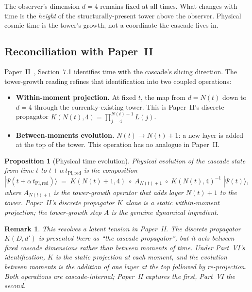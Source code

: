 \documentclass[12pt,a4paper]{article}
\newtheorem{proposition}[theorem]{Proposition}
\newtheorem*{remark}{Remark}
\begin{document}
The observer's dimension $d = 4$ remains fixed at all times. What changes with
time is the \emph{height} of the structurally-present tower above the observer.
Physical cosmic time is the tower's growth, not a coordinate the cascade lives
in.

\subsection{Reconciliation with Paper~II}

Paper~II~\cite{part2}, Section~7.1 identifies time with the cascade's slicing
direction. The tower-growth reading refines that identification into two coupled
operations:

\begin{itemize}[nosep]
\item \textbf{Within-moment projection.} At fixed $t$, the map from $d = N(t)$
down to $d = 4$ through the currently-existing tower. This is Paper~II's
discrete propagator $K(N(t), 4) = \prod_{j = 4}^{N(t) - 1} L(j)$.

\item \textbf{Between-moments evolution.} $N(t) \to N(t) + 1$: a new layer is
added at the top of the tower. This operation has no analogue in Paper~II.
\end{itemize}

\begin{proposition}[Physical time evolution]\label{prop:time-evolution}
Physical evolution of the cascade state from time $t$ to $t + \alpha\,
t_{\mathrm{Pl,red}}$ is the composition
\[
|\Psi(t + \alpha\,t_{\mathrm{Pl,red}})\rangle
\;=\; K(N(t) + 1, 4) \;\circ\; A_{N(t)+1} \;\circ\; K(N(t), 4)^{-1} \;
|\Psi(t)\rangle,
\]
where $A_{N(t)+1}$ is the tower-growth operator that adds layer $N(t) + 1$ to
the tower. Paper~II's discrete propagator $K$ alone is a static within-moment
projection; the tower-growth step $A$ is the genuine dynamical ingredient.
\end{proposition}

\begin{remark}
This resolves a latent tension in Paper~II. The discrete propagator $K(D, d')$
is presented there as ``the cascade propagator'', but it acts between fixed
cascade dimensions rather than between moments of time. Under Part~VI's
identification, $K$ is the static projection at each moment, and the evolution
between moments is the addition of one layer at the top followed by
re-projection. Both operations are cascade-internal; Paper~II captures the
first, Part~VI the second.
\end{remark}
\end{document}
